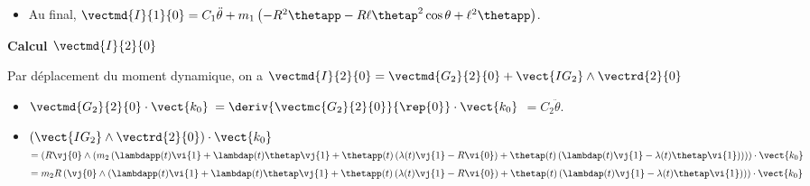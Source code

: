 \begin{corrigebox}
\begin{itemize}
$ = \left(R\vect{j_0}\wedge\left( m_1\thetapp\left(-\ell\vj{1}+R\vi{0} \right)+m_1\ell\thetap^2\vi{1}\right)
-\ell\vi{1}\wedge\left( m_1\thetapp\left(-\ell\vj{1}+R\vi{0} \right)+m_1\ell\thetap^2\vi{1}\right)\right)\cdot \vect{k_0}$

$ = m_1\left(R\vect{j_0}\wedge\left( \thetapp\left(-\ell\vj{1}+R\vi{0} \right)+\ell\thetap^2\vi{1}\right)
-\ell \thetapp\vi{1}\wedge\left(-\ell\vj{1}+R\vi{0} \right)\right)\cdot \vect{k_0}$

$ = m_1\left(R\left( \thetapp\left(-\ell\vect{j_0}\wedge\vj{1}+R\vect{j_0}\wedge\vi{0} \right)+\ell\thetap^2\vect{j_0}\wedge\vi{1}\right)
-\ell \thetapp\left(-\ell\vi{1}\wedge\vj{1}+R\vi{1}\wedge\vi{0} \right)\right)\cdot \vect{k_0}$

$ = m_1\left(R\left( \thetapp\left(-\ell\sin\theta-R \right)-\ell\thetap^2\cos\theta\right)
-\ell \thetapp\left(-\ell-R\sin\theta \right)\right)$

$ = m_1\left(-R\left( \thetapp\left(\ell\sin\theta+R \right)+\ell\thetap^2\cos\theta\right)
+\ell \thetapp\left(\ell+R\sin\theta \right)\right)$

$ = m_1\left( -R\thetapp\ell\sin\theta-R^2\thetapp  -R\ell\thetap^2\cos\theta
+\ell^2 \thetapp+R\ell \thetapp\sin\theta \right)$

$ = m_1\left(-R^2\thetapp  -R\ell\thetap^2\cos\theta +\ell^2 \thetapp\right)$

\item Au final, $ \vectmd{I}{1}{0} =C_1 \ddot{\theta} + m_1\left(-R^2\thetapp  -R\ell\thetap^2\cos\theta +\ell^2 \thetapp\right)$.
\end{itemize}

\textbf{Calcul $\vectmd{I}{2}{0}$}

Par déplacement du moment dynamique, on a 
$\vectmd{I}{2}{0} = \vectmd{G_2}{2}{0} + \vect{IG_2}\wedge \vectrd{2}{0}$
\begin{itemize}
\item $\vectmd{G_2}{2}{0}\cdot \vect{k_0} $ $= \deriv{\vectmc{G_2}{2}{0}}{\rep{0}} \cdot \vect{k_0} $ $=C_2 \ddot{\theta}$.
\item $ \left(\vect{IG_2}\wedge \vectrd{2}{0}\right)  \cdot \vect{k_0}$ 
$ = \left(R\vj{0}\wedge  \left(  m_2 \left( \lambdapp(t)\vi{1} +\lambdap(t)\thetap\vj{1} 
+ \thetapp(t)\left(\lambda(t)\vj{1}-R\vi{0} \right)
+ \thetap(t)\left(\lambdap(t)\vj{1}-\lambda(t)\thetap\vi{1} \right)\right)\right)\right)\cdot \vect{k_0}$
$ =  m_2 R \left(\vj{0}\wedge   \left( \lambdapp(t)\vi{1} +\lambdap(t)\thetap\vj{1} 
+ \thetapp(t)\left(\lambda(t)\vj{1}-R\vi{0} \right)
+ \thetap(t)\left(\lambdap(t)\vj{1}-\lambda(t)\thetap\vi{1} \right)\right)\right)\cdot \vect{k_0}$


\end{itemize}
\end{corrigebox}
